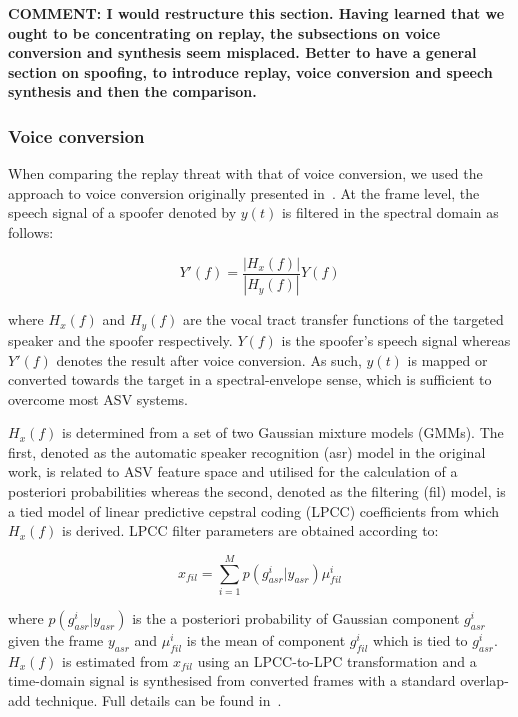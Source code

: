 {\bfseries COMMENT:  I would restructure this section.  Having learned that we ought to be concentrating on replay, the subsections on voice conversion and synthesis seem misplaced.  Better to have a general section on spoofing, to introduce replay, voice conversion and speech synthesis and then the comparison.}

\subsubsection{Voice conversion}
\label{ssec:vconv}

When comparing the replay threat with that of voice conversion, we used the approach to voice conversion originally presented in~\cite{Matrouf2005}. At the frame level, the speech signal of a spoofer denoted by $y(t)$ is filtered in the spectral domain as follows:

\begin{equation}
Y'(f) = \frac{\left|H_{x}(f)\right|}{\left|H_{y}(f)\right|}Y(f)
\label{eq:conversioneq}
\end{equation}

\noindent where $H_{x}(f)$ and $H_{y}(f)$ are the vocal tract transfer functions of the targeted speaker and the spoofer respectively.  $Y(f)$ is the spoofer's speech signal whereas $Y'(f)$ denotes the result after voice conversion.  As such, $y(t)$ is mapped or converted towards the target in a spectral-envelope sense, which is sufficient to overcome most ASV systems. 

$H_x(f)$ is determined from a set of two Gaussian mixture models (GMMs).  The first, denoted as the automatic speaker recognition (asr) model in the original work, is related to ASV feature space and utilised for the calculation of a posteriori probabilities whereas the second, denoted as the filtering (fil) model, is a tied model of linear predictive cepstral coding (LPCC) coefficients from which $H_x(f)$ is derived.  LPCC filter parameters are obtained according to:

\begin{equation}
x_{fil} = \sum\limits_{i=1}^{M}p(g_{asr}^{i}|y_{asr}) \mu_{fil}^{i}
\label{eq:EMit}
\end{equation}

\noindent where $p(g_{asr}^{i}|y_{asr})$ is the a posteriori probability of Gaussian component $g_{asr}^{i}$ given the frame $y_{asr}$ and $\mu_{fil}^{i}$ is the mean of component $g_{fil}^{i}$ which is tied to $g_{asr}^{i}$.  $H_{x}(f)$ is estimated from $x_{fil}$ using an LPCC-to-LPC transformation and a time-domain signal is synthesised from converted frames with a standard overlap-add technique. Full details can be found in~\cite{Matrouf2005,Bonastre2006,Bonastre2007}.


